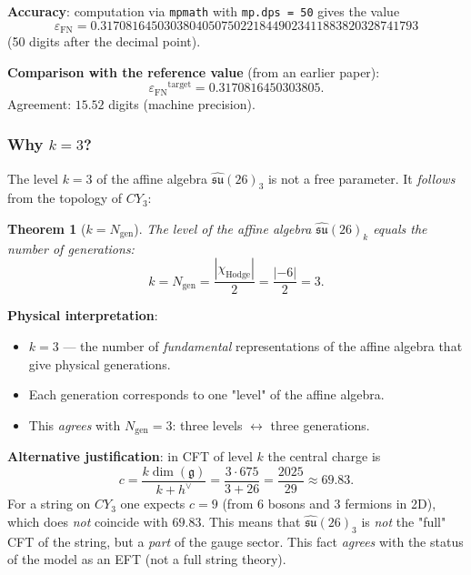 \documentclass[11pt,a4paper]{article}
\newcommand{\CY}{\ensuremath{CY_3}}
\newcommand{\Ngen}{\ensuremath{N_{\text{gen}}}}
\newcommand{\epsFN}{\ensuremath{\varepsilon_{\text{FN}}}}
\newtheorem{theorem}{Theorem}[section]
\theoremstyle{definition}
\begin{document}
\textbf{Accuracy}: computation via \texttt{mpmath} with
\texttt{mp.dps = 50} gives the value
\begin{equation}
    \epsFN = 0.31708164503038040507502218449023411883820328741793
\end{equation}
(50 digits after the decimal point).

\textbf{Comparison with the reference value} (from an earlier paper):
\begin{equation}
    \epsFN^{\text{target}} = 0.3170816450303805.
\end{equation}
Agreement: $15.52$ digits (machine precision).

\subsubsection{Why \texorpdfstring{$k = 3$}{k = 3}?}

The level $k = 3$ of the affine algebra $\hat{\mathfrak{su}}(26)_3$ is
not a free parameter. It \emph{follows} from the topology of $\CY$:

\begin{theorem}[$k = \Ngen$]
\label{thm:k-ngen}
The level of the affine algebra $\hat{\mathfrak{su}}(26)_k$ equals the number
of generations:
\begin{equation}
    k = \Ngen = \frac{|\chi_{\text{Hodge}}|}{2} = \frac{|-6|}{2} = 3.
\end{equation}
\end{theorem}

\textbf{Physical interpretation}:
\begin{itemize}
    \item $k = 3$ --- the number of \emph{fundamental} representations
          of the affine algebra that give physical generations.
    \item Each generation corresponds to one "level" of the
          affine algebra.
    \item This \emph{agrees} with $\Ngen = 3$:
          three levels $\leftrightarrow$ three generations.
\end{itemize}

\medskip\noindent
\textbf{Alternative justification}: in CFT of level $k$ the central
charge is
\begin{equation}
    c = \frac{k \dim(\mathfrak{g})}{k + h^\vee}
    = \frac{3 \cdot 675}{3 + 26} = \frac{2025}{29} \approx 69.83.
\end{equation}
For a string on $\CY$ one expects $c = 9$ (from 6 bosons and 3 fermions
in 2D), which does \emph{not} coincide with $69.83$. This means that
$\hat{\mathfrak{su}}(26)_3$ is \emph{not} the "full" CFT of the string,
but a \emph{part} of the gauge sector. This fact \emph{agrees}
with the status of the model as an EFT (not a full string theory).
\end{document}
